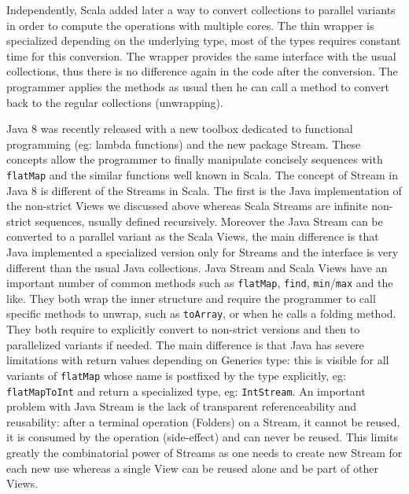 \documentclass[a4paper,12pt,twocolumn]{article}
\begin{document}
Independently, Scala added later a way to convert collections to parallel variants in order to compute the operations with multiple cores.
The thin wrapper is specialized depending on the underlying type, most of the types requires constant time for this conversion.
The wrapper provides the same interface with the usual collections, thus there is no difference again in the code after the conversion.
The programmer applies the methods as usual then he can call a method to convert back to the regular collections (unwrapping).

Java 8 was recently released with a new toolbox dedicated to functional programming (eg: lambda functions) and the new package Stream.
These concepts allow the programmer to finally manipulate concisely sequences with \verb|flatMap| and the similar functions well known in Scala.
The concept of Stream in Java 8 is different of the Streams in Scala.
The first is the Java implementation of the non-strict Views we discussed above whereas Scala Streams are infinite non-strict sequences, usually defined recursively. %
Moreover the Java Stream can be converted to a parallel variant as the Scala Views, the main difference is that Java implemented a specialized version only for Streams and the interface is very different than the usual Java collections.
Java Stream and Scala Views have an important number of common methods such as \verb|flatMap|, \verb|find|, \verb|min|/\verb|max| and the like.
They both wrap the inner structure and require the programmer to call specific methods to unwrap, such as \verb|toArray|, or when he calls a folding method.
They both require to explicitly convert to non-strict versions and then to parallelized variants if needed.
The main difference is that Java has severe limitations with return values depending on Generics type: this is visible for all variants of \verb|flatMap| whose name is postfixed by the type explicitly, eg: \verb|flatMapToInt| and return a specialized type, eg: \verb|IntStream|.
An important problem with Java Stream is the lack of transparent referenceability and reusability: after a terminal operation (Folders) on a Stream, it cannot be reused, it is consumed by the operation (side-effect) and can never be reused.
This limits greatly the combinatorial power of Streams as one needs to create new Stream for each new use whereas a single View can be reused alone and be part of other Views.
\end{document}
